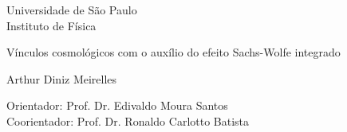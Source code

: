 \begin{titlepage}
\pagestyle{empty}
\begin{center}

	{\fontsize{16}{16} \selectfont Universidade de São Paulo \\}
	\vspace{0.1cm}
	{\fontsize{16}{16} \selectfont Instituto de Física}
    \vspace{3.3cm}

	{\fontsize{22}{22}\selectfont Vínculos cosmológicos com o auxílio do efeito Sachs-Wolfe integrado \par}
    \vspace{2cm}


    {\fontsize{18}{18}\selectfont Arthur Diniz Meirelles \par}

    \vspace{2cm}

\end{center}

\leftskip 6cm
\begin{flushright}	
\leftskip 6cm
Orientador: Prof. Dr.  Edivaldo Moura Santos \\
\leftskip 6cm
Coorientador: Prof. Dr. Ronaldo Carlotto Batista
\end{flushright}	

    \vspace{0.8cm}    


\par
\leftskip 6cm
\par
\leftskip 0cm
\vskip 2cm



\end{titlepage}
